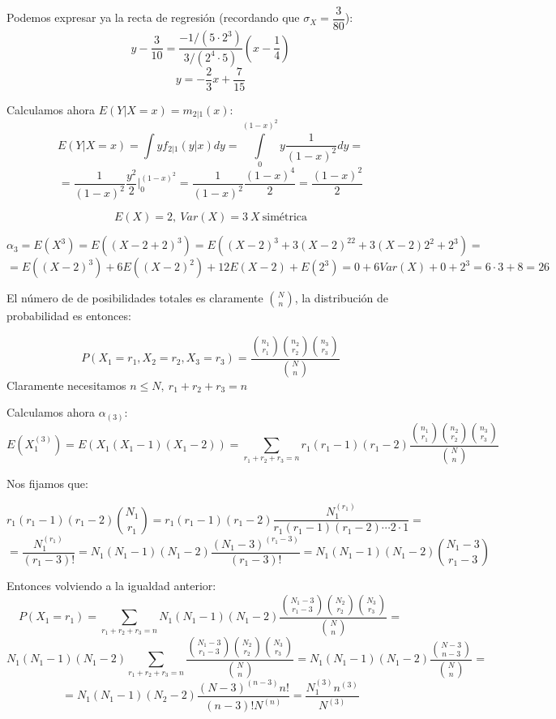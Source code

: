 \documentclass[openany]{book}
\begin{document}
\begin{exercise}
    Podemos expresar ya la recta de regresión (recordando que $ \sigma_{X}  = \dfrac{3}{80}$):
    $$ y-\dfrac{3}{10} = \dfrac{-1/(5\cdot 2^3)}{3/(2^{4}\cdot 5)}(x-\dfrac{1}{4}) $$
    $$ y = -\dfrac{2}{3}x+\dfrac{7}{15} $$

    Calculamos ahora $ E(Y|X=x) = m_{2|1}(x) $:
    $$ E(Y|X=x) = \int\limits_{}^{}y f_{2|1}(y|x)dy = \int\limits_{0}^{(1-x)^2}y \dfrac{1}{(1-x)^2}dy = $$
    $$ =\dfrac{1}{(1-x)^2} \dfrac{y^2}{2} \Biggr|_{0}^{(1-x)^2} = \dfrac{1}{(1-x)^2} \dfrac{(1-x)^{4}}{2} = \dfrac{(1-x)^2}{2} $$


\end{exercise}


\begin{exercise}
    $$ E(X) = 2,\ Var(X) = 3\ X\ \text{simétrica} $$
    
    $$ \alpha_{3} = E(X^3) = E((X-2+2)^3) = E((X-2)^3+3(X-2)^22+3(X-2)2^2+2^3) = $$
    $$= E((X-2)^3)+6E((X-2)^2) +12 E(X-2)+E(2^3) = 0 + 6 Var(X)+0+2^3 = 6\cdot 3+8 = 26$$
\end{exercise}


\begin{exercise}
    $  $\\
    El número de de posibilidades totales es claramente $ \binom{N}{n} $, la distribución de probabilidad es entonces:

    $$ P(X_1=r_1,X_2=r_2,X_3=r_3) = \dfrac{\binom{n_1}{r_1}\binom{n_2}{r_2}\binom{n_3}{r_3}}{\binom{N}{n}} $$
    Claramente necesitamos $ n\leq N,\ r_1+r_2+r_3=n $

    Calculamos ahora $ \alpha_{(3)} $:
    $$ E(X_1 ^{(3)}) = E(X_1(X_1-1)(X_1-2)) = \sum\limits_{r_1+r_2+r_3=n}^{}r_1(r_1-1)(r_1-2)\dfrac{\binom{n_1}{r_1}\binom{n_2}{r_2}\binom{n_3}{r_3}}{\binom{N}{n}} $$

    Nos fijamos que:

    $$r_1(r_1-1)(r_1-2)  \binom{N_1}{r_1} = r_1(r_1-1)(r_1-2) \dfrac{N_1 ^{(r_1)}}{r_1(r_1-1)(r_1-2)\cdots 2\cdot 1} = $$
    $$ =\dfrac{N_1 ^{(r_1)}}{(r_1-3)!} = N_1(N_1-1)(N_1-2) \dfrac{(N_1-3) ^{(r_1-3)}}{(r_1-3)!}  = N_1(N_1-1)(N_1-2)\binom{N_1-3}{r_1-3}$$

    Entonces volviendo a la igualdad anterior:
    $$ P(X_1=r_1) = \sum\limits_{r_1+r_2+r_3=n}^{}N_1(N_1-1)(N_1-2) \dfrac{\binom{N_1-3}{r_1-3}\binom{N_2}{r_2}\binom{N_3}{r_3}}{\binom{N}{n}} =  $$
    $$ N_1(N_1-1)(N_1-2)\sum\limits_{r_1+r_2+r_3=n}^{} \dfrac{\binom{N_1-3}{r_1-3}\binom{N_2}{r_2}\binom{N_3}{r_3}}{\binom{N}{n}} = N_1(N_1-1)(N_1-2) \dfrac{\binom{N-3}{n-3}}{\binom{N}{n}} =$$
    $$ = N_1(N_1-1)(N_2-2) \dfrac{(N-3) ^{(n-3)}n!}{(n-3)!N ^{(n)}} = \dfrac{N_1 ^{(3)}n ^{(3)}}{N ^{(3)}} $$
\end{exercise}
\end{document}
